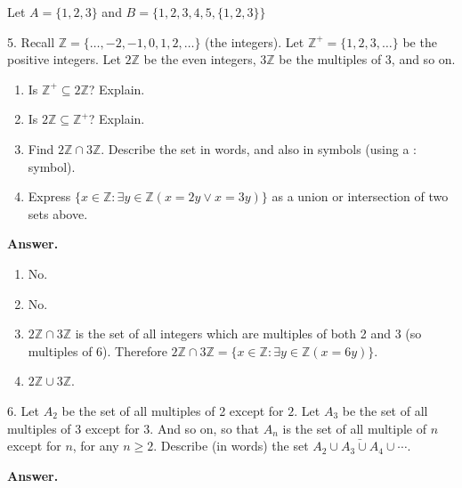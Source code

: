 \documentclass[10pt,]{book}
\theoremstyle{plain}
\theoremstyle{definition}
\theoremstyle{definition}
\theoremstyle{definition}
\def\Z{\mathbb Z}
\def\st{:}
\begin{document}
\begin{exerciselist}
            Let \(A = \{1,2,3\}\) and \(B = \{1,2,3,4,5,\{1,2,3\}\}\)
\item[5.]\hypertarget{exercise-5}{}
            Recall \(\Z = \{\ldots,-2,-1,0, 1,2,\ldots\}\) (the integers). Let \(\Z^+ = \{1, 2, 3, \ldots\}\) be the positive integers. Let \(2\Z\) be the even integers, \(3\Z\) be the multiples of 3, and so on.
\leavevmode%
\begin{enumerate}[label=(\alph*)]
\item\hypertarget{li-88}{}
                Is \(\Z^+ \subseteq 2\Z\)? Explain.
\item\hypertarget{li-89}{}
                Is \(2\Z \subseteq \Z^+\)? Explain.
\item\hypertarget{li-90}{}
                Find \(2\Z \cap 3\Z\). Describe the set in words, and also in symbols (using a \(\st\) symbol).
\item\hypertarget{li-91}{}
                Express \(\{x \in \Z \st \exists y\in \Z (x = 2y \vee x = 3y)\}\) as a union or intersection of two sets above.
\end{enumerate}
\par\smallskip
\par\smallskip
\noindent\textbf{Answer.}\hypertarget{answer-5}{}\quad
\leavevmode%
\begin{enumerate}[label=(\alph*)]
\item\hypertarget{li-92}{}
                No.
\item\hypertarget{li-93}{}
                No.
\item\hypertarget{li-94}{}\(2\Z \cap 3\Z\) is the set of all integers which are multiples of both 2 and 3 (so multiples of 6). Therefore \(2\Z \cap 3\Z = \{x \in \Z \st \exists y\in \Z(x = 6y)\}\).\item\hypertarget{li-95}{}\(2\Z \cup 3\Z\).\end{enumerate}
\item[6.]\hypertarget{exercise-6}{}
            Let \(A_2\) be the set of all multiples of 2 except for \(2\). Let \(A_3\) be the set of all multiples of 3 except for 3. And so on, so that \(A_n\) is the set of all multiple of \(n\) except for \(n\), for any \(n \ge 2\).
            Describe (in words) the set \(\bar{A_2 \cup A_3 \cup A_4 \cup \cdots}\).
\par\smallskip
\par\smallskip
\noindent\textbf{Answer.}\hypertarget{answer-6}{}\quad


\end{exerciselist}
\end{document}
